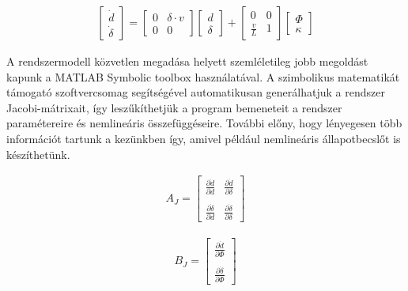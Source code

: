     \begin{align} \label{eq:of3}
        \begin{bmatrix}
               \dot{d} \\
               \dot{\delta}
        \end{bmatrix}
        =
        \begin{bmatrix}
               0 & \delta \cdot v \\
               0 & 0
        \end{bmatrix}
        \begin{bmatrix}
               d \\
               \delta
        \end{bmatrix}
		+
        \begin{bmatrix}
           0 & 0 \\
           \frac{v}{L} & 1
         \end{bmatrix}
         \begin{bmatrix}
               \Phi \\
               \kappa
        \end{bmatrix}
     \end{align}

A rendszermodell közvetlen megadása helyett szemléletileg jobb megoldást kapunk a MATLAB Symbolic toolbox használatával. A szimbolikus matematikát támogató szoftvercsomag segítségével automatikusan generálhatjuk a rendszer Jacobi-mátrixait, így leszűkíthetjük a program bemeneteit a rendszer paramétereire és nemlineáris összefüggéseire. További előny, hogy lényegesen több információt tartunk a kezünkben így, amivel például nemlineáris állapotbecslőt is készíthetünk.
     
\begin{minipage}{0.45\linewidth}
    \begin{align}
        A_J =
        \begin{bmatrix}
           \frac{\partial \dot{d}}{\partial d} & \frac{\partial \dot{d}}{\partial \delta} \\
           & \\
           \frac{\partial \dot{\delta}}{\partial d} & \frac{\partial \dot{\delta}}{\partial \delta}
         \end{bmatrix}
     \end{align}
\end{minipage}
\begin{minipage}{0.45\linewidth}
    \begin{align}
        B_J =
         \begin{bmatrix}
               \frac{\partial \dot{d}}{\partial \Phi} \\
               \\
               \frac{\partial \dot{\delta}}{\partial \Phi}
        \end{bmatrix}
     \end{align}
\end{minipage}

